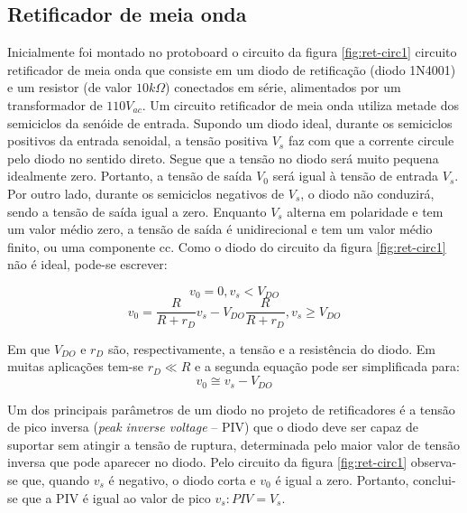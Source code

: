 \documentclass[a4paper]{article} %
\begin{document}
\subsection{Retificador de meia onda}
         Inicialmente foi montado no protoboard o circuito da figura \ref{fig:ret-circ1} circuito retificador de meia onda que consiste em um diodo de retificação (diodo 1N4001) e um resistor (de valor $10k\Omega$) conectados em série, alimentados por um transformador de $110V_{ac}$.
         Um circuito retificador de meia onda utiliza metade dos semiciclos da senóide de entrada. Supondo um diodo ideal, durante os semiciclos positivos da entrada senoidal, a tensão positiva $V_s$ faz com que a corrente circule pelo diodo no sentido direto. Segue que a tensão no diodo será muito pequena idealmente zero. Portanto, a tensão de saída $V_0$ será igual à tensão de entrada $V_s$. Por outro lado, durante os semiciclos negativos de $V_s$, o diodo não conduzirá, sendo a tensão de saída igual a zero. Enquanto $V_s$ alterna em polaridade e tem um valor médio zero, a tensão de saída é unidirecional e tem um valor médio finito, ou uma componente cc.
         Como o diodo do circuito da figura \ref{fig:ret-circ1} não é ideal, pode-se escrever:
     
\begin{equation}
  v_0=0,       v_s<V_{DO}
\end{equation}
\begin{equation}
v_0=\frac{R}{R+r_D}v_s -V_{DO}\frac{R}{R+r_D},      v_s \geq V_{DO}
\end{equation}


    Em que   $V_{DO}$     e $r_D$ são, respectivamente, a tensão e a resistência do diodo.
         Em muitas aplicações tem-se  $r_D \ll R$           e a segunda equação pode ser simplificada para:
\begin{equation}
v_0 \cong v_s-V_{DO}
\end{equation}


         Um dos principais parâmetros de um diodo no projeto de retificadores é a tensão de pico inversa (\textit{peak inverse voltage} – PIV) que o diodo deve ser capaz de suportar sem atingir a
tensão de ruptura, determinada pelo maior valor de tensão inversa que pode aparecer no diodo. Pelo circuito da figura  \ref{fig:ret-circ1} observa-se que, quando $v_s$ é negativo, o diodo corta e   $v_0$      é
igual a zero. Portanto, conclui-se que a PIV é igual ao valor de pico $v_s:PIV=V_s$.
\end{document}
